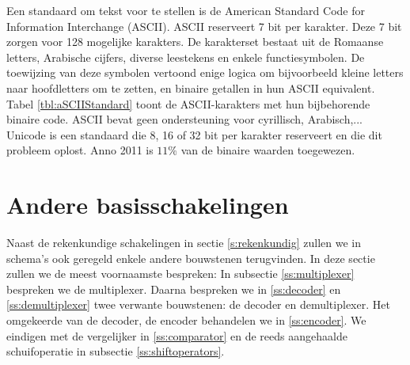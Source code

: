 Een standaard om tekst voor te stellen is de American Standard Code for Information Interchange (ASCII). ASCII reserveert 7 bit per karakter. Deze 7 bit zorgen voor 128 mogelijke karakters. De karakterset bestaat uit de Romaanse letters, Arabische cijfers, diverse leestekens en enkele functiesymbolen. De toewijzing van deze symbolen vertoond enige logica om bijvoorbeeld kleine letters naar hoofdletters om te zetten, en binaire getallen in hun ASCII equivalent. Tabel \ref{tbl:aSCIIStandard} toont de ASCII-karakters met hun bijbehorende binaire code. ASCII bevat geen ondersteuning voor cyrillisch, Arabisch,... Unicode is een standaard die 8, 16 of 32 bit per karakter reserveert en die dit probleem oplost. Anno 2011 is $11\%$ van de binaire waarden toegewezen.
\section{Andere basisschakelingen}
\label{s:andereBasis}
Naast de rekenkundige schakelingen in sectie \ref{s:rekenkundig} zullen we in schema's ook geregeld enkele andere bouwstenen terugvinden. In deze sectie zullen we de meest voornaamste bespreken: In subsectie \ref{ss:multiplexer} bespreken we de multiplexer. Daarna bespreken we in \ref{ss:decoder} en \ref{ss:demultiplexer} twee verwante bouwstenen: de decoder en demultiplexer. Het omgekeerde van de decoder, de encoder behandelen we in \ref{ss:encoder}. We eindigen met de vergelijker in \ref{ss:comparator} en de reeds aangehaalde schuifoperatie in subsectie \ref{ss:shiftoperators}.
